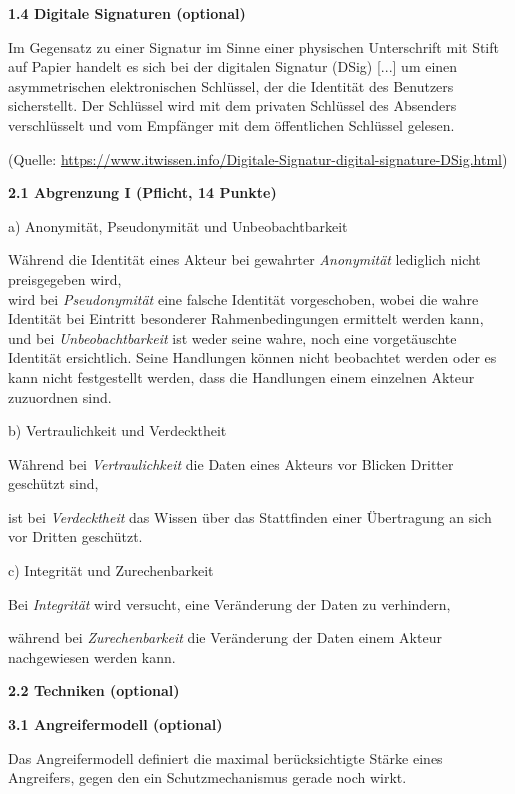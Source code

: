 \documentclass[ngerman]{fbi-aufgabenblatt}
\begin{document}
\textbf{1.4 Digitale Signaturen (optional)}

Im Gegensatz zu einer Signatur im Sinne einer physischen Unterschrift mit Stift auf Papier handelt es sich
\dq bei der digitalen Signatur (DSig) [...] um einen asymmetrischen elektronischen Schlüssel, 
der die Identität des Benutzers sicherstellt. Der Schlüssel wird mit dem privaten Schlüssel des Absenders verschlüsselt 
und vom Empfänger mit dem öffentlichen Schlüssel gelesen.\dq

(Quelle: \url{https://www.itwissen.info/Digitale-Signatur-digital-signature-DSig.html})


\newpage
%
%

\textbf{2.1 Abgrenzung I (Pflicht, 14 Punkte)}

a) Anonymität, Pseudonymität und Unbeobachtbarkeit

Während die Identität eines Akteur bei gewahrter \emph{Anonymität} lediglich nicht preisgegeben wird,\\
wird bei \emph{Pseudonymität} eine falsche Identität vorgeschoben, wobei die wahre Identität bei Eintritt besonderer Rahmenbedingungen ermittelt werden kann,\\
und bei \emph{Unbeobachtbarkeit} ist weder seine wahre, noch eine vorgetäuschte Identität ersichtlich. Seine Handlungen können nicht beobachtet werden oder es kann nicht festgestellt werden, dass die Handlungen einem einzelnen Akteur zuzuordnen sind.  

b) Vertraulichkeit und Verdecktheit

Während bei \emph{Vertraulichkeit} die Daten eines Akteurs vor Blicken Dritter geschützt sind,

ist bei \emph{Verdecktheit} das Wissen über das Stattfinden einer Übertragung an sich vor Dritten geschützt.

c) Integrität und Zurechenbarkeit

Bei \emph{Integrität} wird versucht, eine Veränderung der Daten zu verhindern, 

während bei \emph{Zurechenbarkeit} die Veränderung der Daten einem Akteur nachgewiesen werden kann.

\textbf{2.2 Techniken (optional)}


\newpage
{}

\textbf{3.1 Angreifermodell (optional)}

Das Angreifermodell definiert die maximal berücksichtigte Stärke eines
Angreifers, gegen den ein Schutzmechanismus gerade noch wirkt.
\end{document}
